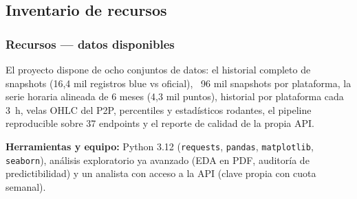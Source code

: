 \subsection{Inventario de recursos}

\subsubsection{Recursos --- datos disponibles}

El proyecto dispone de ocho conjuntos de datos: el historial completo de
snapshots (16,4 mil registros blue vs oficial), ~96 mil snapshots por
plataforma, la serie horaria alineada de 6 meses (4,3 mil puntos), historial
por plataforma cada 3~h, velas OHLC del P2P, percentiles y estadísticos
rodantes, el pipeline reproducible sobre 37 endpoints y el reporte de calidad
de la propia API.

\textbf{Herramientas y equipo:} Python 3.12 (\texttt{requests}, \texttt{pandas},
\texttt{matplotlib}, \texttt{seaborn}), análisis exploratorio ya avanzado (EDA
en PDF, auditoría de predictibilidad) y un analista con acceso a la API (clave
propia con cuota semanal).

